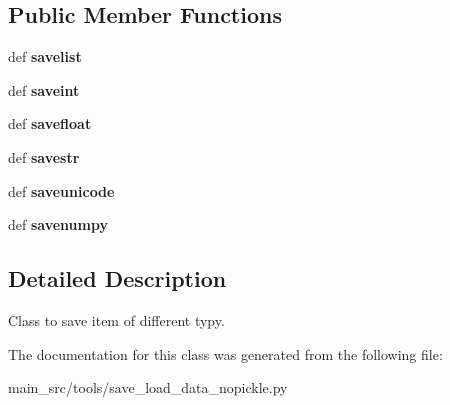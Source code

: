 \subsection*{Public Member Functions}
\begin{DoxyCompactItemize}
\item 
\hypertarget{classmain__src_1_1tools_1_1save__load__data__nopickle_1_1SaveItems_ae5a19fc59356eb599310313f76c16c87}{def {\bfseries savelist}}\label{classmain__src_1_1tools_1_1save__load__data__nopickle_1_1SaveItems_ae5a19fc59356eb599310313f76c16c87}

\item 
\hypertarget{classmain__src_1_1tools_1_1save__load__data__nopickle_1_1SaveItems_ab44fb19fb0e310f17127a4a3b09a8a48}{def {\bfseries saveint}}\label{classmain__src_1_1tools_1_1save__load__data__nopickle_1_1SaveItems_ab44fb19fb0e310f17127a4a3b09a8a48}

\item 
\hypertarget{classmain__src_1_1tools_1_1save__load__data__nopickle_1_1SaveItems_a62dc2e10040aa5d387dab09fdcdb3b0e}{def {\bfseries savefloat}}\label{classmain__src_1_1tools_1_1save__load__data__nopickle_1_1SaveItems_a62dc2e10040aa5d387dab09fdcdb3b0e}

\item 
\hypertarget{classmain__src_1_1tools_1_1save__load__data__nopickle_1_1SaveItems_a9ddca2b9949a7a5c6fd6885cbffc12aa}{def {\bfseries savestr}}\label{classmain__src_1_1tools_1_1save__load__data__nopickle_1_1SaveItems_a9ddca2b9949a7a5c6fd6885cbffc12aa}

\item 
\hypertarget{classmain__src_1_1tools_1_1save__load__data__nopickle_1_1SaveItems_af9866c446f69a555259cdb3055676875}{def {\bfseries saveunicode}}\label{classmain__src_1_1tools_1_1save__load__data__nopickle_1_1SaveItems_af9866c446f69a555259cdb3055676875}

\item 
\hypertarget{classmain__src_1_1tools_1_1save__load__data__nopickle_1_1SaveItems_a9cf2b0064ffdbe4dba408409512deec7}{def {\bfseries savenumpy}}\label{classmain__src_1_1tools_1_1save__load__data__nopickle_1_1SaveItems_a9cf2b0064ffdbe4dba408409512deec7}

\end{DoxyCompactItemize}


\subsection{Detailed Description}
Class to save item of different typy. 

The documentation for this class was generated from the following file\-:\begin{DoxyCompactItemize}
\item 
main\-\_\-src/tools/save\-\_\-load\-\_\-data\-\_\-nopickle.\-py\end{DoxyCompactItemize}
